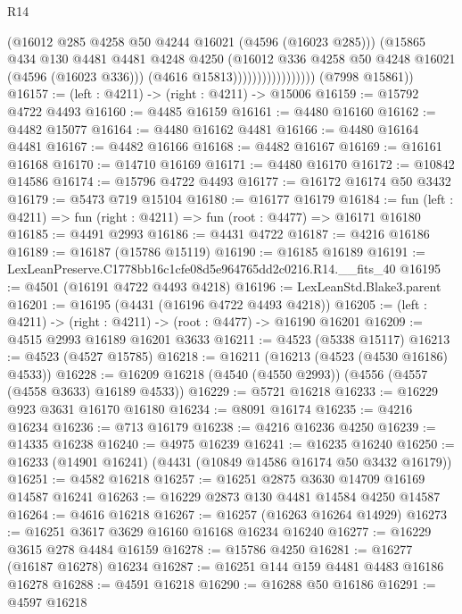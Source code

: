 \begin{lexlean}{R14}
\begin{coremodule}
                                    (@16012 @285 @4258 @50 @4244 @16021 (@4596 (@16023 @285)))
                                    (@15865
                                      @434
                                      @130
                                      @4481
                                      @4481
                                      @4248
                                      @4250
                                      (@16012 @336 @4258 @50 @4248 @16021 (@4596 (@16023 @336)))
                                      (@4616 @15813)))))))))))))))))
      (@7998 @15861))
@16157 := (left : @4211) -> (right : @4211) -> @15006
@16159 := @15792 @4722 @4493
@16160 := @4485 @16159
@16161 := @4480 @16160
@16162 := @4482 @15077
@16164 := @4480 @16162 @4481
@16166 := @4480 @16164 @4481
@16167 := @4482 @16166
@16168 := @4482 @16167
@16169 := @16161 @16168
@16170 := @14710 @16169
@16171 := @4480 @16170
@16172 := @10842 @14586
@16174 := @15796 @4722 @4493
@16177 := @16172 @16174 @50 @3432
@16179 := @5473 @719 @15104
@16180 := @16177 @16179
@16184 := fun (left : @4211) => fun (right : @4211) => fun (root : @4477) => @16171 @16180
@16185 := @4491 @2993
@16186 := @4431 @4722
@16187 := @4216 @16186
@16189 := @16187 (@15786 @15119)
@16190 := @16185 @16189
@16191 := LexLeanPreserve.C1778bb16c1cfe08d5e964765dd2c0216.R14.__fits_40
@16195 := @4501 (@16191 @4722 @4493 @4218)
@16196 := LexLeanStd.Blake3.parent
@16201 := @16195 (@4431 (@16196 @4722 @4493 @4218))
@16205 := (left : @4211) -> (right : @4211) -> (root : @4477) -> @16190 @16201
@16209 := @4515 @2993 @16189 @16201 @3633
@16211 := @4523 (@5338 @15117)
@16213 := @4523 (@4527 @15785)
@16218 := @16211 (@16213 (@4523 (@4530 @16186) @4533))
@16228 := @16209 @16218 (@4540 (@4550 @2993)) (@4556 (@4557 (@4558 @3633) @16189 @4533))
@16229 := @5721 @16218
@16233 := @16229 @923 @3631 @16170 @16180
@16234 := @8091 @16174
@16235 := @4216 @16234
@16236 := @713 @16179
@16238 := @4216 @16236 @4250
@16239 := @14335 @16238
@16240 := @4975 @16239
@16241 := @16235 @16240
@16250 := @16233 (@14901 @16241) (@4431 (@10849 @14586 @16174 @50 @3432 @16179))
@16251 := @4582 @16218
@16257 := @16251 @2875 @3630 @14709 @16169 @14587 @16241
@16263 := @16229 @2873 @130 @4481 @14584 @4250 @14587
@16264 := @4616 @16218
@16267 := @16257 (@16263 @16264 @14929)
@16273 := @16251 @3617 @3629 @16160 @16168 @16234 @16240
@16277 := @16229 @3615 @278 @4484 @16159
@16278 := @15786 @4250
@16281 := @16277 (@16187 @16278) @16234
@16287 := @16251 @144 @159 @4481 @4483 @16186 @16278
@16288 := @4591 @16218
@16290 := @16288 @50 @16186
@16291 := @4597 @16218

\end{coremodule}
\end{lexlean}
